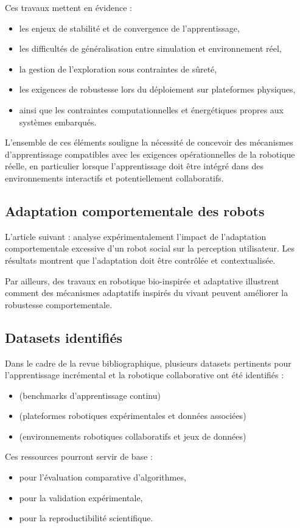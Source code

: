Ces travaux mettent en évidence :
\begin{itemize}
    \item les enjeux de stabilité et de convergence de l’apprentissage,
    \item les difficultés de généralisation entre simulation et environnement réel,
    \item la gestion de l’exploration sous contraintes de sûreté,
    \item les exigences de robustesse lors du déploiement sur plateformes physiques,
    \item ainsi que les contraintes computationnelles et énergétiques propres aux systèmes embarqués.
\end{itemize}

L’ensemble de ces éléments souligne la nécessité de concevoir des mécanismes d’apprentissage compatibles avec les exigences opérationnelles de la robotique réelle, en particulier lorsque l’apprentissage doit être intégré dans des environnements interactifs et potentiellement collaboratifs.

\subsection{Adaptation comportementale des robots}

L’article suivant : \cite{social_robot_adaptation} analyse expérimentalement l’impact de l’adaptation comportementale excessive d’un robot social sur la perception utilisateur. Les résultats montrent que l’adaptation doit être contrôlée et contextualisée.

Par ailleurs, des travaux en robotique bio-inspirée et adaptative \cite{bio_inspired_robotics} illustrent comment des mécanismes adaptatifs inspirés du vivant peuvent améliorer la robustesse comportementale.

\subsection{Datasets identifiés}

Dans le cadre de la revue bibliographique, plusieurs datasets pertinents pour l’apprentissage incrémental et la robotique collaborative ont été identifiés :
\begin{itemize}
    \item \cite{continual_learning_benchmarks} (benchmarks d’apprentissage continu)
    \item \cite{mdpi_platform_data} (plateformes robotiques expérimentales et données associées)
    \item \cite{mdpi_collab_data} (environnements robotiques collaboratifs et jeux de données)
\end{itemize}

Ces ressources pourront servir de base :
\begin{itemize}
    \item pour l’évaluation comparative d’algorithmes,
    \item pour la validation expérimentale,
    \item pour la reproductibilité scientifique.
\end{itemize}

